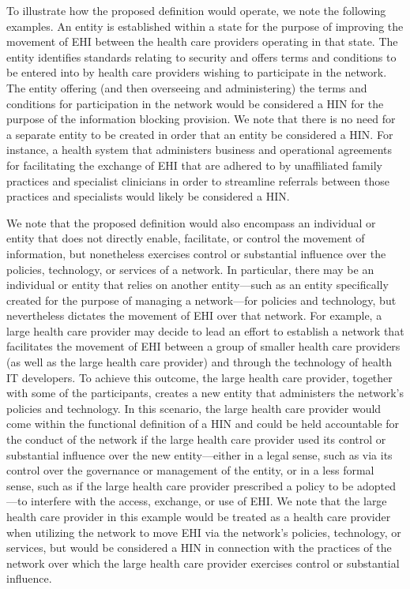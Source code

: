 \documentclass[twoside,11pt]{article}
\begin{document}
          To illustrate how the proposed definition would operate, we note the following examples. An entity is established within a state for the purpose of improving the movement of EHI between the health care providers operating in that state. The entity identifies standards relating to security and offers terms and conditions to be entered into by health care providers wishing to participate in the network. The entity offering (and then overseeing and administering) the terms and conditions for participation in the network would be considered a HIN for the purpose of the information blocking provision. We note that there is no need for a separate entity to be created in order that an entity be considered a HIN. For instance, a health system that administers business and operational agreements for facilitating the exchange of EHI that are adhered to by unaffiliated family practices and specialist clinicians in order to streamline referrals between those practices and specialists would likely be considered a HIN.



          We note that the proposed definition would also encompass an individual or entity that does not directly enable, facilitate, or control the movement of information, but nonetheless exercises control or substantial influence over the policies, technology, or services of a network. In particular, there may be an individual or entity that relies on another entity—such as an entity specifically created for the purpose of managing a network—for policies and technology, but nevertheless dictates the movement of EHI over that network. For example, a large health care provider may decide to lead an effort to establish a network that facilitates the movement of EHI between a group of smaller health care providers (as well as the large health care provider) and through the technology of health IT developers. To achieve this outcome, the large health care provider, together with some of the participants, creates a new entity that administers the network's policies and technology. In this scenario, the large health care provider would come within the functional definition of a HIN and could be held accountable for the conduct of the network if the large health care provider used its control or substantial influence over the new entity—either in a legal sense, such as via its control over the governance or management of the entity, or in a less formal sense, such as if the large health care provider prescribed a policy to be adopted—to interfere with the access, exchange, or use of EHI. We note that the large health care provider in this example would be treated as a health care provider when utilizing the  \ifhmode\expandafter\xspace\fi network to move EHI via the network's policies, technology, or services, but would be considered a HIN in connection with the practices of the network over which the large health care provider exercises control or substantial influence.
\end{document}
